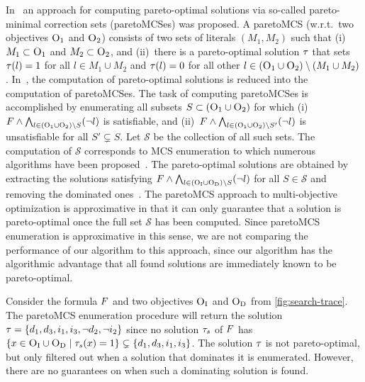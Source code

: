 In~\textcite{DBLP:conf/ijcai/Terra-NevesLM18a,DBLP:conf/aaai/Terra-NevesLM18,DBLP:conf/ijcai/Terra-NevesLM18} an approach for computing pareto-optimal solutions via so-called pareto-minimal correction sets (paretoMCSes) was proposed.
A paretoMCS (w.r.t.\ two objectives $\textsc{O}_1$ and $\textsc{O}_2$) consists of two sets of literals $(M_1, M_2)$ such that (i)~$M_1 \subset \textsc{O}_1$ and $M_2 \subset \textsc{O}_2$, and (ii)~there is a pareto-optimal solution $\tau$ that sets $\tau(l) = 1$ for all $l \in M_1 \cup M_2$ and $\tau(l) = 0$ for all other $l \in (\textsc{O}_1 \cup \textsc{O}_2) \setminus (M_1 \cup M_2)$.
In~\textcite{DBLP:conf/ijcai/Terra-NevesLM18a}, the computation of pareto-optimal solutions is reduced into the computation of paretoMCSes.
The task of computing paretoMCSes is accomplished by enumerating all subsets $S \subset  (\textsc{O}_1 \cup \textsc{O}_2)$ for which (i)~$F \land \bigwedge_{l \in  (\textsc{O}_1 \cup \textsc{O}_2) \setminus S} (\lnot l)$ is satisfiable, and (ii)~$F \land \bigwedge_{l \in  (\textsc{O}_1 \cup \textsc{O}_2) \setminus S'} (\lnot l)$ is unsatisfiable for all $S' \subsetneq S$.
Let $\mathcal{S}$ be the collection of all such sets.
The computation of $\mathcal{S}$ corresponds to MCS enumeration to which numerous algorithms have been proposed~\autocite{DBLP:conf/lpar/BendikC20,DBLP:conf/hvc/MorgadoLM12,DBLP:conf/sat/PrevitiMJM17}.
The pareto-optimal solutions are obtained by extracting the solutions satisfying $F \land \bigwedge_{l \in  (\textsc{O}_{\text{I}} \cup \textsc{O}_{\text{D}}) \setminus S} (\lnot l)$ for all $S \in \mathcal{S}$ and removing the dominated ones~\autocite{DBLP:conf/ijcai/Terra-NevesLM18a}.
The paretoMCS approach to multi-objective optimization is approximative in that it can only guarantee that a solution is pareto-optimal once the full set $\mathcal{S}$ has been computed.
Since paretoMCS enumeration is approximative in this sense, we are not comparing the performance of our algorithm to this approach, since our algorithm has the algorithmic advantage that all found solutions are immediately known to be pareto-optimal.

\begin{example}\label{ex:MCS}
  Consider the formula $F$ and two objectives $\textsc{O}_{\text{I}}$ and $\textsc{O}_{\text{D}}$ from \cref{fig:search-trace}.
  The paretoMCS enumeration procedure will return the solution $\tau = \{d_1, d_3, i_1, i_3, \lnot d_2, \lnot i_2\}$ since no solution $\tau_s$ of $F$ has $\{x \in \textsc{O}_{\text{I}} \cup \textsc{O}_{\text{D}} \mid  \tau_s(x) = 1\} \subsetneq \{d_1, d_3, i_1, i_3\}$.
  The solution $\tau$ is not pareto-optimal, but only filtered out when a solution that dominates it is enumerated.
  However, there are no guarantees on when such a dominating solution is found. 
\end{example}

